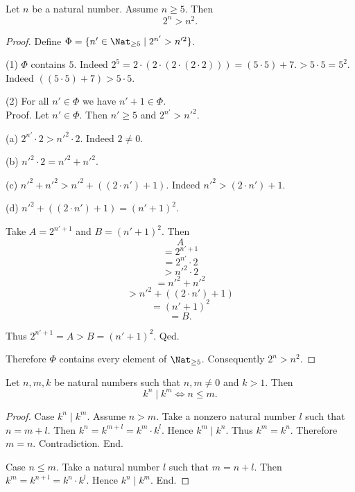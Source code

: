 \begin{forthel}
  \begin{proposition}
    Let $n$ be a natural number.
    Assume $n \geq 5$.
    Then \[ 2^{n} > n^{2}. \]
  \end{proposition}
  \begin{proof}
    Define $\Phi = \{ n' \in \Nat_{\geq 5} \mid 2^{n'} > n'^{2} \}$.

    (1) $\Phi$ contains $5$.
    Indeed $2^{5}
       = 2 \cdot (2 \cdot (2 \cdot (2 \cdot 2)))
       = (5 \cdot 5) + 7.
      > 5 \cdot 5
      = 5^{2}$.
    Indeed $((5 \cdot 5) + 7) > 5 \cdot 5$.

    (2) For all $n' \in \Phi$ we have $n' + 1 \in \Phi$. \\
    Proof.
      Let $n' \in \Phi$.
      Then $n' \geq 5$ and $2^{n'} > n'^{2}$.

      (a) $2^{n'} \cdot 2 > n'^{2} \cdot 2$.
      Indeed $2 \neq 0$.

      (b) $n'^{2} \cdot 2 = n'^{2} + n'^{2}$.

      (c) $n'^{2} + n'^{2} > n'^{2} + ((2 \cdot n') + 1)$.
      Indeed $n'^{2} > (2 \cdot n') + 1$.

      (d) $n'^{2} + ((2 \cdot n') + 1) = (n' + 1)^{2}$.

      Take $A = 2^{n' + 1}$ and $B = (n' + 1)^{2}$. %
      Then
      \[  A                                 \]
      \[    = 2^{n' + 1}                    \]
      \[    = 2^{n'} \cdot 2                \]
      \[    > n'^{2} \cdot 2                \]  %
      \[    = n'^{2} + n'^{2}               \]  %
      \[    > n'^{2} + ((2 \cdot n') + 1)   \]  %
      \[    = (n' + 1)^{2}                  \]  %
      \[    = B.                            \]

      Thus $2^{n' + 1} = A > B = (n' + 1)^{2}$.
    Qed.

    Therefore $\Phi$ contains every element of $\Nat_{\geq 5}$.
    Consequently $2^{n} > n^{2}$.
  \end{proof}
\end{forthel}

\begin{forthel}
  \begin{proposition}
    Let $n, m, k$ be natural numbers such that $n, m \neq 0$ and $k > 1$.
    Then \[ k^{n} \mid k^{m} \iff n \leq m. \]
  \end{proposition}
  \begin{proof}
    Case $k^{n} \mid k^{m}$.
      Assume $n > m$.
      Take a nonzero natural number $l$ such that $n = m + l$.
      Then $k^{n}
        = k^{m + l}
        = k^{m} \cdot k^{l}$.
      Hence $k^{m} \mid k^{n}$.
      Thus $k^{m} = k^{n}$.
      Therefore $m = n$.
      Contradiction.
    End.

    Case $n \leq m$.
      Take a natural number $l$ such that $m = n + l$.
      Then $k^{m}
        = k^{n + l}
        = k^{n} \cdot k^{l}$.
      Hence $k^{n} \mid k^{m}$.
    End.
  \end{proof}
\end{forthel}

